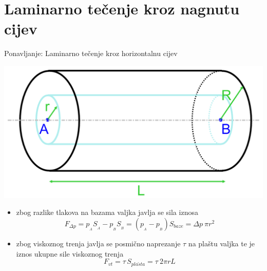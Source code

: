 \documentclass{beamer}
\begin{document}
\naslovnislajd

\section{Laminarno tečenje kroz nagnutu cijev}

\begin{frame}{Ponavljanje: Laminarno tečenje kroz horizontalnu cijev}

\begin{center}
\includegraphics[width=0.5\paperwidth]{slike/slika1.PNG}
\end{center}
\begin{itemize}
\item zbog razlike tlakova na bazama valjka javlja se sila iznosa
\[
F_{\Delta p}=p_{_{A}}S_{_{A}}-p_{_{B}}S_{_{B}}=(p_{_{A}}-p_{_{B}})S_{baze}=\Delta p\:\pi r^{2}
\]
\item zbog viskoznog trenja javlja se posmično naprezanje $\tau$ na plaštu
valjka te je iznos ukupne sile viskoznog trenja
\[
F_{vt}=\tau\,S_{pla\check{s}ta}=\tau\:2\pi rL
\]
\end{itemize}
\end{frame}
\end{document}
